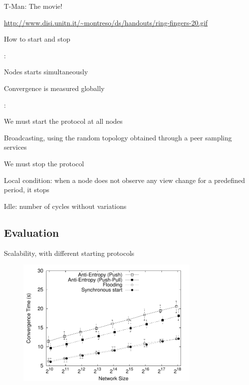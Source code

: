 \begin{frame}{T-Man: The movie!}
	
\url{http://www.disi.unitn.it/~montreso/ds/handouts/ring-fingers-20.gif}

\begin{figure}
\end{figure}


\end{frame}


\begin{frame}{How to start and stop}
	
:\\
\BIL
\item Nodes starts simultaneously
\item Convergence is measured globally
\EIL

\bigskip
{}:\\
\BIL
\item We must start the protocol at all nodes
\BI
\item Broadcasting, using the random topology obtained through a peer sampling services
\EI
\item We must stop the protocol
\BI
\item Local condition: when a node does not observe any view change for a predefined period, it stops
\item Idle: number of cycles without variations
\EI
\EIL

\end{frame}

\subsection{Evaluation}

\begin{frame}{Scalability, with different starting protocols}
	
\begin{figure}
	\includegraphics[width=0.80\textwidth]{sort-size-ctime}
\end{figure}	
	
\end{frame}

